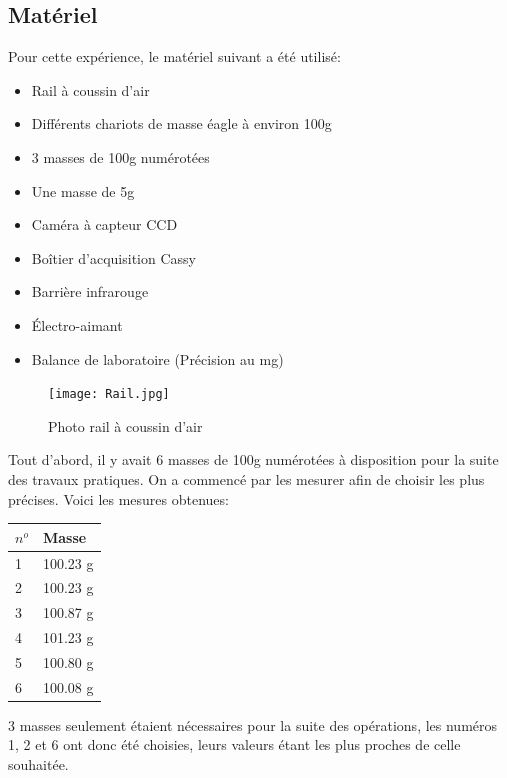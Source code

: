 \subsection{Matériel}
Pour cette expérience, le matériel suivant a été utilisé:
\begin{itemize}
    \item Rail à coussin d'air
    \item Différents chariots de masse éagle à environ 100g
    \item 3 masses de 100g numérotées
    \item Une masse de 5g
    \item Caméra à capteur CCD
    \item Boîtier d'acquisition Cassy
    \item Barrière infrarouge
    \item Électro-aimant
    \item Balance de laboratoire (Précision au mg)
\end{itemize}

\begin{figure}[h]
    \caption[Photo rail à coussin d'air]{Photo rail à coussin d'air}
    \centering
    \texttt{[image: Rail.jpg]}
\end{figure}

Tout d'abord, il y avait 6 masses de 100g numérotées à disposition pour la suite des travaux pratiques. On a commencé par les mesurer afin de choisir les plus précises. Voici les mesures obtenues:
\begin{table}[h]
    \centering
    \begin{tabular}{|l|l|}
	\hline
	$n^o$ & Masse \\
	\hline
	1 & 100.23 g \\
	2 & 100.23 g \\
	3 & 100.87 g \\
	4 & 101.23 g \\
	5 & 100.80 g \\
	6 & 100.08 g \\
	\hline
    \end{tabular}
\end{table}
3 masses seulement étaient nécessaires pour la suite des opérations, les numéros 1, 2 et 6 ont donc été choisies, leurs valeurs étant les plus proches de celle souhaitée.

